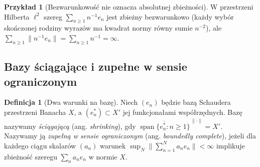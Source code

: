 \documentclass[11pt,a4paper]{article}
\numberwithin{equation}{section}
\theoremstyle{plain}
\theoremstyle{definition}
\newtheorem{definicja}[twierdzenie]{Definicja}
\newtheorem{przyklad}[twierdzenie]{Przykład}
\theoremstyle{remark}
\begin{document}
\begin{przyklad}[Bezwarunkowość nie oznacza absolutnej zbieżności]
\label{ex:not-absolute27}
W przestrzeni Hilberta $\ell^2$ szereg
$\sum_{n\ge1}n^{-1}e_n$ jest zbieżny bezwarunkowo
(każdy wybór skończonej rodziny wyrazów ma kwadrat
normy równy sumie $n^{-2}$), ale
$\sum_{n\ge1}\|n^{-1}e_n\|=\sum_{n\ge1}n^{-1}=\infty$.
\end{przyklad}

\subsection{Bazy ściągające i zupełne w sensie ograniczonym}

\begin{definicja}[Dwa warunki na bazę]
\label{def:shrinking-bcomplete27}
Niech $(e_n)$ będzie bazą Schaudera przestrzeni Banacha $X$,
a $(e_n^*)\subset X'$ jej funkcjonałami współrzędnych.
Bazę nazywamy \emph{ściągającą} (ang. \emph{shrinking}), gdy
$\overline{\operatorname{span}\{e_n^*:n\ge1\}}^{\,\|\cdot\|}=X'$.
Nazywamy ją \emph{zupełną w sensie ograniczonym}
(ang. \emph{boundedly complete}), jeżeli dla każdego ciągu
skalarów $(a_n)$ warunek
$\sup_N\|\sum_{n=1}^Na_ne_n\|<\infty$
implikuje zbieżność szeregu $\sum_na_ne_n$ w normie $X$.
\end{definicja}
\end{document}
